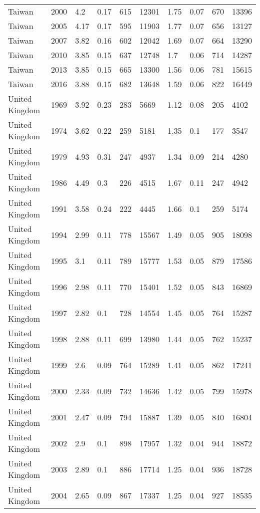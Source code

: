 \begin{tabular}{llllllllll}
Taiwan & 2000 & 4.2 & 0.17 & 615 & 12301 & 1.75 & 0.07 & 670 & 13396 \\ 
Taiwan & 2005 & 4.17 & 0.17 & 595 & 11903 & 1.77 & 0.07 & 656 & 13127 \\ 
Taiwan & 2007 & 3.82 & 0.16 & 602 & 12042 & 1.69 & 0.07 & 664 & 13290 \\ 
Taiwan & 2010 & 3.85 & 0.15 & 637 & 12748 & 1.7 & 0.06 & 714 & 14287 \\ 
Taiwan & 2013 & 3.85 & 0.15 & 665 & 13300 & 1.56 & 0.06 & 781 & 15615 \\ 
Taiwan & 2016 & 3.88 & 0.15 & 682 & 13648 & 1.59 & 0.06 & 822 & 16449 \\ 
United Kingdom & 1969 & 3.92 & 0.23 & 283 & 5669 & 1.12 & 0.08 & 205 & 4102 \\ 
United Kingdom & 1974 & 3.62 & 0.22 & 259 & 5181 & 1.35 & 0.1 & 177 & 3547 \\ 
United Kingdom & 1979 & 4.93 & 0.31 & 247 & 4937 & 1.34 & 0.09 & 214 & 4280 \\ 
United Kingdom & 1986 & 4.49 & 0.3 & 226 & 4515 & 1.67 & 0.11 & 247 & 4942 \\ 
United Kingdom & 1991 & 3.58 & 0.24 & 222 & 4445 & 1.66 & 0.1 & 259 & 5174 \\ 
United Kingdom & 1994 & 2.99 & 0.11 & 778 & 15567 & 1.49 & 0.05 & 905 & 18098 \\ 
United Kingdom & 1995 & 3.1 & 0.11 & 789 & 15777 & 1.53 & 0.05 & 879 & 17586 \\ 
United Kingdom & 1996 & 2.98 & 0.11 & 770 & 15401 & 1.52 & 0.05 & 843 & 16869 \\ 
United Kingdom & 1997 & 2.82 & 0.1 & 728 & 14554 & 1.45 & 0.05 & 764 & 15287 \\ 
United Kingdom & 1998 & 2.88 & 0.11 & 699 & 13980 & 1.44 & 0.05 & 762 & 15237 \\ 
United Kingdom & 1999 & 2.6 & 0.09 & 764 & 15289 & 1.41 & 0.05 & 862 & 17241 \\ 
United Kingdom & 2000 & 2.33 & 0.09 & 732 & 14636 & 1.42 & 0.05 & 799 & 15978 \\ 
United Kingdom & 2001 & 2.47 & 0.09 & 794 & 15887 & 1.39 & 0.05 & 840 & 16804 \\ 
United Kingdom & 2002 & 2.9 & 0.1 & 898 & 17957 & 1.32 & 0.04 & 944 & 18872 \\ 
United Kingdom & 2003 & 2.89 & 0.1 & 886 & 17714 & 1.25 & 0.04 & 936 & 18728 \\ 
United Kingdom & 2004 & 2.65 & 0.09 & 867 & 17337 & 1.25 & 0.04 & 927 & 18535 \\ 

\end{tabular}
